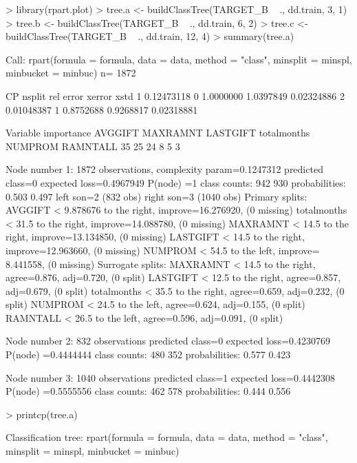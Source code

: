 \documentclass{article}
\begin{document}
\begin{Schunk}
\begin{Sinput}
> library(rpart.plot)
> tree.a <- buildClassTree(TARGET_B ~ ., dd.train, 3, 1)
> tree.b <- buildClassTree(TARGET_B ~ ., dd.train, 6, 2)
> tree.c <- buildClassTree(TARGET_B ~ ., dd.train, 12, 4)
> summary(tree.a)
\end{Sinput}
\begin{Soutput}
Call:
rpart(formula = formula, data = data, method = "class", minsplit = minspl, 
    minbucket = minbuc)
  n= 1872 

          CP nsplit rel error    xerror       xstd
1 0.12473118      0 1.0000000 1.0397849 0.02324886
2 0.01048387      1 0.8752688 0.9268817 0.02318881

Variable importance
    AVGGIFT    MAXRAMNT    LASTGIFT totalmonths     NUMPROM    RAMNTALL 
         35          25          24           8           5           3 

Node number 1: 1872 observations,    complexity param=0.1247312
  predicted class=0  expected loss=0.4967949  P(node) =1
    class counts:   942   930
   probabilities: 0.503 0.497 
  left son=2 (832 obs) right son=3 (1040 obs)
  Primary splits:
      AVGGIFT     < 9.878676 to the right, improve=16.276920, (0 missing)
      totalmonths < 31.5     to the right, improve=14.088780, (0 missing)
      MAXRAMNT    < 14.5     to the right, improve=13.134850, (0 missing)
      LASTGIFT    < 14.5     to the right, improve=12.963660, (0 missing)
      NUMPROM     < 54.5     to the left,  improve= 8.441558, (0 missing)
  Surrogate splits:
      MAXRAMNT    < 14.5     to the right, agree=0.876, adj=0.720, (0 split)
      LASTGIFT    < 12.5     to the right, agree=0.857, adj=0.679, (0 split)
      totalmonths < 35.5     to the right, agree=0.659, adj=0.232, (0 split)
      NUMPROM     < 24.5     to the left,  agree=0.624, adj=0.155, (0 split)
      RAMNTALL    < 26.5     to the left,  agree=0.596, adj=0.091, (0 split)

Node number 2: 832 observations
  predicted class=0  expected loss=0.4230769  P(node) =0.4444444
    class counts:   480   352
   probabilities: 0.577 0.423 

Node number 3: 1040 observations
  predicted class=1  expected loss=0.4442308  P(node) =0.5555556
    class counts:   462   578
   probabilities: 0.444 0.556 
\end{Soutput}
\begin{Sinput}
> printcp(tree.a)
\end{Sinput}
\begin{Soutput}
Classification tree:
rpart(formula = formula, data = data, method = "class", minsplit = minspl, 
    minbucket = minbuc)


\end{Soutput}
\end{Schunk}
\end{document}
